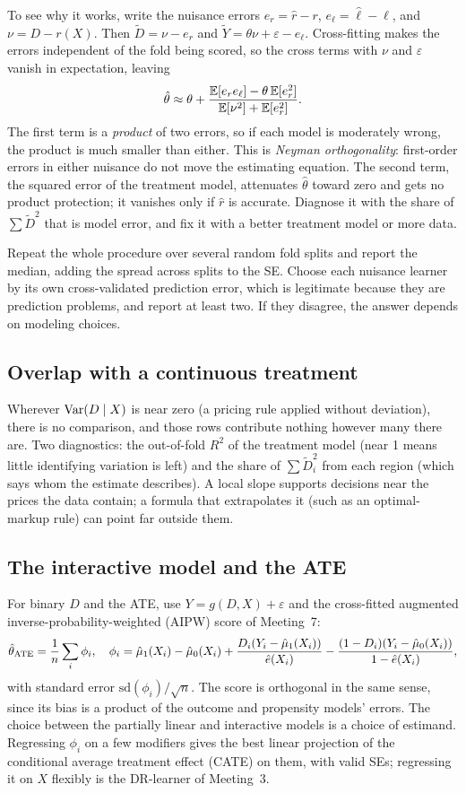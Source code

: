 \documentclass[11pt]{article}
\begin{document}
To see why it works, write the nuisance errors $e_r = \hat r - r$, $e_\ell = \hat\ell - \ell$, and $\nu = D - r(X)$. Then
$\tilde D = \nu - e_r$ and $\tilde Y = \theta\nu + \varepsilon - e_\ell$. Cross-fitting makes the errors independent of the fold being
scored, so the cross terms with $\nu$ and $\varepsilon$ vanish in expectation, leaving
\[
  \hat\theta \approx \theta + \frac{\mathbb{E}[e_re_\ell] - \theta\,\mathbb{E}[e_r^2]}{\mathbb{E}[\nu^2] + \mathbb{E}[e_r^2]} .
\]
The first term is a \emph{product} of two errors, so if each model is moderately wrong, the product is much smaller than either. This
is \emph{Neyman orthogonality}: first-order errors in either nuisance do not move the estimating equation. The second term, the
squared error of the treatment model, attenuates $\hat\theta$ toward zero and gets no product protection; it vanishes only if $\hat r$ is
accurate. Diagnose it with the share of $\sum\tilde D^2$ that is model error, and fix it with a better treatment model or more data.

Repeat the whole procedure over several random fold splits and report the median, adding the spread across splits to the SE. Choose
each nuisance learner by its own cross-validated prediction error, which is legitimate because they are prediction problems, and
report at least two. If they disagree, the answer depends on modeling choices.

\subsection{Overlap with a continuous treatment}

Wherever $\operatorname{Var}(D \mid X)$ is near zero (a pricing rule applied without deviation), there is no comparison, and those rows contribute
nothing however many there are. Two diagnostics: the out-of-fold $R^2$ of the treatment model (near 1 means little identifying
variation is left) and the share of $\sum\tilde D_i^2$ from each region (which says whom the estimate describes). A local slope supports
decisions near the prices the data contain; a formula that extrapolates it (such as an optimal-markup rule) can point far outside them.

\subsection{The interactive model and the ATE}

For binary $D$ and the ATE, use $Y = g(D, X) + \varepsilon$ and the cross-fitted augmented inverse-probability-weighted (AIPW) score
of Meeting~7:
\[
  \hat\theta_{\text{ATE}} = \frac1n\sum_i\phi_i, \quad
  \phi_i = \hat\mu_1(X_i) - \hat\mu_0(X_i) + \frac{D_i(Y_i - \hat\mu_1(X_i))}{\hat e(X_i)} - \frac{(1-D_i)(Y_i - \hat\mu_0(X_i))}{1 - \hat e(X_i)},
\]
with standard error $\text{sd}(\phi_i)/\sqrt n$. The score is orthogonal in the same sense, since its bias is a product of the outcome
and propensity models' errors. The choice between the partially linear and interactive models is a choice of estimand. Regressing
$\phi_i$ on a few modifiers gives the best linear projection of the conditional average treatment effect (CATE) on them, with valid SEs;
regressing it on $X$ flexibly is the DR-learner of Meeting~3.
\end{document}
